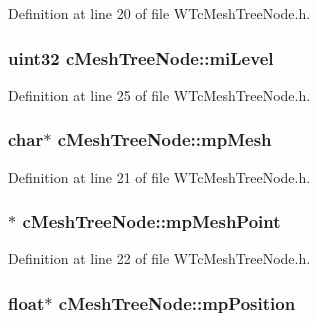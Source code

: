 Definition at line 20 of file WTcMeshTreeNode.h.

\hypertarget{classc_mesh_tree_node_a849588f1cad1d35030b1b7e148e5776b}{
\subsubsection[{miLevel}]{\setlength{\rightskip}{0pt plus 5cm}uint32 {\bf cMeshTreeNode::miLevel}}}
\label{classc_mesh_tree_node_a849588f1cad1d35030b1b7e148e5776b}


Definition at line 25 of file WTcMeshTreeNode.h.

\hypertarget{classc_mesh_tree_node_af94ac50e58c5d1b29f7d971746d2b217}{
\subsubsection[{mpMesh}]{\setlength{\rightskip}{0pt plus 5cm}char$\ast$ {\bf cMeshTreeNode::mpMesh}}}
\label{classc_mesh_tree_node_af94ac50e58c5d1b29f7d971746d2b217}


Definition at line 21 of file WTcMeshTreeNode.h.

\hypertarget{classc_mesh_tree_node_a5207bf917599f81dcdd19877876a3987}{
\subsubsection[{mpMeshPoint}]{$\ast$ {\bf cMeshTreeNode::mpMeshPoint}}}
\label{classc_mesh_tree_node_a5207bf917599f81dcdd19877876a3987}


Definition at line 22 of file WTcMeshTreeNode.h.

\hypertarget{classc_mesh_tree_node_a70182df675cd9e665453177ff5959e92}{
\subsubsection[{mpPosition}]{\setlength{\rightskip}{0pt plus 5cm}float$\ast$ {\bf cMeshTreeNode::mpPosition}}}
\label{classc_mesh_tree_node_a70182df675cd9e665453177ff5959e92}


